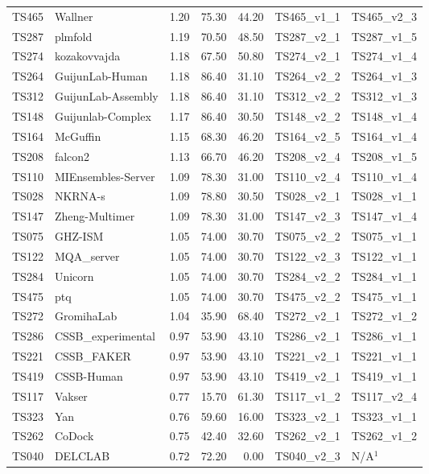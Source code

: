 \begin{table}[ht]
{\begin{tabular}{llrrrll}
TS465 & Wallner & 1.20 & 75.30 & 44.20 & TS465\_v1\_1 & TS465\_v2\_3 \\ 
TS287 & plmfold & 1.19 & 70.50 & 48.50 & TS287\_v2\_1 & TS287\_v1\_5 \\ 
TS274 & kozakovvajda & 1.18 & 67.50 & 50.80 & TS274\_v2\_1 & TS274\_v1\_4 \\ 
TS264 & GuijunLab-Human & 1.18 & 86.40 & 31.10 & TS264\_v2\_2 & TS264\_v1\_3 \\ 
TS312 & GuijunLab-Assembly & 1.18 & 86.40 & 31.10 & TS312\_v2\_2 & TS312\_v1\_3 \\ 
TS148 & Guijunlab-Complex & 1.17 & 86.40 & 30.50 & TS148\_v2\_2 & TS148\_v1\_4 \\ 
TS164 & McGuffin & 1.15 & 68.30 & 46.20 & TS164\_v2\_5 & TS164\_v1\_4 \\ 
TS208 & falcon2 & 1.13 & 66.70 & 46.20 & TS208\_v2\_4 & TS208\_v1\_5 \\ 
TS110 & MIEnsembles-Server & 1.09 & 78.30 & 31.00 & TS110\_v2\_4 & TS110\_v1\_4 \\ 
TS028 & NKRNA-s & 1.09 & 78.80 & 30.50 & TS028\_v2\_1 & TS028\_v1\_1 \\ 
TS147 & Zheng-Multimer & 1.09 & 78.30 & 31.00 & TS147\_v2\_3 & TS147\_v1\_4 \\ 
TS075 & GHZ-ISM & 1.05 & 74.00 & 30.70 & TS075\_v2\_2 & TS075\_v1\_1 \\ 
TS122 & MQA\_server & 1.05 & 74.00 & 30.70 & TS122\_v2\_3 & TS122\_v1\_1 \\ 
TS284 & Unicorn & 1.05 & 74.00 & 30.70 & TS284\_v2\_2 & TS284\_v1\_1 \\ 
TS475 & ptq & 1.05 & 74.00 & 30.70 & TS475\_v2\_2 & TS475\_v1\_1 \\ 
TS272 & GromihaLab & 1.04 & 35.90 & 68.40 & TS272\_v2\_1 & TS272\_v1\_2 \\ 
TS286 & CSSB\_experimental & 0.97 & 53.90 & 43.10 & TS286\_v2\_1 & TS286\_v1\_1 \\ 
TS221 & CSSB\_FAKER & 0.97 & 53.90 & 43.10 & TS221\_v2\_1 & TS221\_v1\_1 \\ 
TS419 & CSSB-Human & 0.97 & 53.90 & 43.10 & TS419\_v2\_1 & TS419\_v1\_1 \\ 
TS117 & Vakser & 0.77 & 15.70 & 61.30 & TS117\_v1\_2 & TS117\_v2\_4 \\ 
TS323 & Yan & 0.76 & 59.60 & 16.00 & TS323\_v2\_1 & TS323\_v1\_1 \\ 
TS262 & CoDock & 0.75 & 42.40 & 32.60 & TS262\_v2\_1 & TS262\_v1\_2 \\ 
TS040 & DELCLAB & 0.72 & 72.20 & 0.00 & TS040\_v2\_3 & N/A$^{1}$ \\ 

\end{tabular}}
\end{table}
